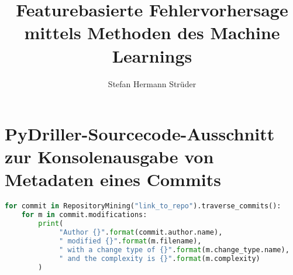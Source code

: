\documentclass[master,twoside,extern,palatino]{rgseThesis}
\author{Stefan Hermann Strüder}
\title{Featurebasierte Fehlervorhersage mittels Methoden des Machine Learnings}
\begin{document}

    \maketitle

    
    
    
    
    

    \tableofcontents
    \cleardoublepage

    \listoffigures   %
    \cleardoublepage
    
    \listoftables   %
    \cleardoublepage


    

    

    
    
    
    
    
    
    
    
    
    


    \printbibliography[heading=bibintoc]

\appendix

\chapter{PyDriller-Sourcecode-Ausschnitt zur Konsolenausgabe von Metadaten eines Commits}
\label{appendix4}

\begin{lstlisting}[language=Python, caption=Beispielhafter PyDriller-Code zur Ausgabe von Metadaten von Commits, frame=single, label=pydriller]
for commit in RepositoryMining("link_to_repo").traverse_commits(): 
	for m in commit.modifications: 
		print( 
		     "Author {}".format(commit.author.name),
		     " modified {}".format(m.filename),
		     " with a change type of {}".format(m.change_type.name),
		     " and the complexity is {}".format(m.complexity)
		)
\end{lstlisting}
\end{document}
